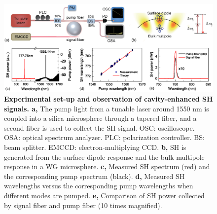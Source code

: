 \documentclass[a4paper,8pt,hyperref, twocolumn]{article}
\begin{document}
\begin{figure}[!ht]
\centering
\includegraphics[width=18cm]{Fig1.eps}
\caption{\textbf{Experimental set-up and observation of cavity-enhanced SH signals. a, }The pump light from a tunable laser around 1550 nm is coupled into a silica microsphere through a tapered fiber, and a second fiber is used to collect the SH signal. OSC: oscilloscope. OSA: optical spectrum analyzer. PLC: polarization controller. BS: beam splitter. EMCCD: electron-multiplying CCD. \textbf{b, }SH is generated from the surface dipole response and the bulk multipole response in a WG microsphere. \textbf{c, }Measured SH spectrum (red) and the corresponding pump spectrum (black). \textbf{d, }Measured SH wavelengths versus the corresponding pump wavelengths when different modes are pumped. \textbf{e, }Comparison of SH power collected by signal fiber and pump fiber (10 times magnified).}
\label{pic:Fig1}
\end{figure}




\end{document}
